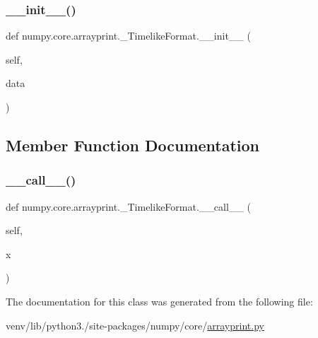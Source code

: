 \subsubsection{\texorpdfstring{\+\_\+\+\_\+init\+\_\+\+\_\+()}{\_\_init\_\_()}}
{\footnotesize\ttfamily def numpy.\+core.\+arrayprint.\+\_\+\+Timelike\+Format.\+\_\+\+\_\+init\+\_\+\+\_\+ (\begin{DoxyParamCaption}\item[{}]{self,  }\item[{}]{data }\end{DoxyParamCaption})}



\subsection{Member Function Documentation}
\mbox{\label{classnumpy_1_1core_1_1arrayprint_1_1__TimelikeFormat_a3637ccce50b8d483986c59b60966fff4}} 
\subsubsection{\texorpdfstring{\+\_\+\+\_\+call\+\_\+\+\_\+()}{\_\_call\_\_()}}
{\footnotesize\ttfamily def numpy.\+core.\+arrayprint.\+\_\+\+Timelike\+Format.\+\_\+\+\_\+call\+\_\+\+\_\+ (\begin{DoxyParamCaption}\item[{}]{self,  }\item[{}]{x }\end{DoxyParamCaption})}



The documentation for this class was generated from the following file\+:\begin{DoxyCompactItemize}
\item 
venv/lib/python3./site-\/packages/numpy/core/\hyperlink{core_2arrayprint_8py}{arrayprint.\+py}\end{DoxyCompactItemize}

